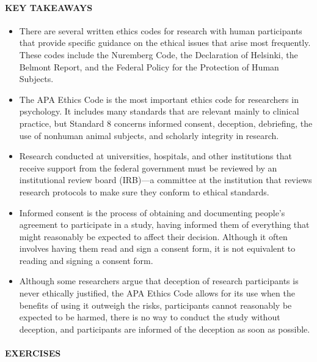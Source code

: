 \documentclass[
]{krantz}
\providecommand{\tightlist}{%
  \setlength{\itemsep}{0pt}\setlength{\parskip}{0pt}}
\begin{document}
\hypertarget{key-takeaways-9}{%
\paragraph*{KEY TAKEAWAYS}\label{key-takeaways-9}}

\begin{itemize}
\tightlist
\item
  There are several written ethics codes for research with human participants that provide specific guidance on the ethical issues that arise most frequently. These codes include the Nuremberg Code, the Declaration of Helsinki, the Belmont Report, and the Federal Policy for the Protection of Human Subjects.
\item
  The APA Ethics Code is the most important ethics code for researchers in psychology. It includes many standards that are relevant mainly to clinical practice, but Standard 8 concerns informed consent, deception, debriefing, the use of nonhuman animal subjects, and scholarly integrity in research.
\item
  Research conducted at universities, hospitals, and other institutions that receive support from the federal government must be reviewed by an institutional review board (IRB)---a committee at the institution that reviews research protocols to make sure they conform to ethical standards.
\item
  Informed consent is the process of obtaining and documenting people's agreement to participate in a study, having informed them of everything that might reasonably be expected to affect their decision. Although it often involves having them read and sign a consent form, it is not equivalent to reading and signing a consent form.
\item
  Although some researchers argue that deception of research participants is never ethically justified, the APA Ethics Code allows for its use when the benefits of using it outweigh the risks, participants cannot reasonably be expected to be harmed, there is no way to conduct the study without deception, and participants are informed of the deception as soon as possible.
\end{itemize}

\hypertarget{exercises-8}{%
\paragraph*{EXERCISES}\label{exercises-8}}
\end{document}
